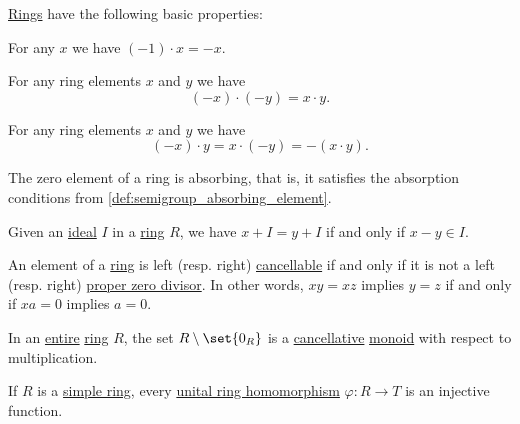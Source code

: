 \begin{proposition}\label{thm:def:ring}
  \hyperref[def:ring]{Rings} have the following basic properties:
  \begin{thmenum}
     For any \( x \) we have \( (-1) \cdot x = -x \).

     For any ring elements \( x \) and \( y \) we have
    \begin{equation}\label{eq:thm:def:ring/multiplication_even_sign}
      (-x) \cdot (-y) = x \cdot y.
    \end{equation}

     For any ring elements \( x \) and \( y \) we have
    \begin{equation}\label{eq:thm:def:ring/multiplication_odd_sign}
      (-x) \cdot y = x \cdot (-y) = -(x \cdot y).
    \end{equation}

     The zero element of a ring is absorbing, that is, it satisfies the absorption conditions from \cref{def:semigroup_absorbing_element}.

     Given an \hyperref[def:semiring_ideal]{ideal} \( I \) in a \hyperref[def:ring]{ring} \( R \), we have \( x + I = y + I \) if and only if \( x - y \in I \).

     An element of a \hyperref[def:ring]{ring} is left (resp. right) \hyperref[def:binary_operation/cancellative]{cancellable} if and only if it is not a left (resp. right) \hyperref[def:semiring_divisibility/zero]{proper zero divisor}. In other words, \( xy = xz \) implies \( y = z \) if and only if \( xa = 0 \) implies \( a = 0 \).

     In an \hyperref[def:entire_semiring]{entire} \hyperref[def:ring]{ring} \( R \), the set \( R \setminus \set{ 0_R } \) is a \hyperref[def:binary_operation/cancellative]{cancellative} \hyperref[def:monoid]{monoid} with respect to multiplication.

     If \( R \) is a \hyperref[def:ring/simple]{simple ring}, every \hyperref[def:ring/morphism]{unital ring homomorphism} \( \varphi: R \to T \) is an injective function.
  \end{thmenum}
\end{proposition}

